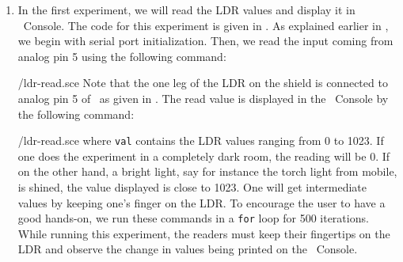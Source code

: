 \begin{enumerate}
  \item In the first experiment, we will read the LDR values and display it in
        \scilab\ Console. The code for this experiment is 
        given in  . As explained earlier in , 
        we begin with serial port initialization. Then, we read the input coming from
        analog pin 5 using the following command:  
        
        {\LocLDRscicode/ldr-read.sce}
        Note that the one leg of the LDR on
        the shield is connected to analog pin 5 of \arduino\, 
        as given in . The read value is displayed in the 
        \scilab\ Console by the following command: 
        
        {\LocLDRscicode/ldr-read.sce} where {\tt val} contains
        the LDR values ranging from 0 to 1023. If one does the experiment in a completely dark room, the
        reading will be 0. If on the other hand, a bright light, say for instance the torch
        light from mobile, is shined, the value displayed is close to 1023. One will get
        intermediate values by keeping one’s finger on the LDR. To
        encourage the user to have a good hands-on, we run these commands in
        a {\tt for} loop for 500 iterations. While running this experiment, the readers must keep their fingertips on the LDR and
        observe the change in values being printed on the \scilab\ Console. 
        
        
        

\end{enumerate}
